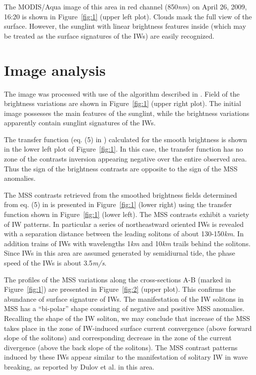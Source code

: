 \documentclass{report}
\begin{document}
The MODIS/Aqua image of this area in red channel (850\textit{nm}) on April 26, 2009, 16:20 is shown in Figure~\ref{fig:1} (upper left plot). Clouds mask the full view of the surface. However, the sunglint with linear brightness features inside (which may be treated as the surface signatures of the IWs) are easily recognized.


\section{Image analysis}

The image was processed with use of the algorithm described in \citep{Kudryavtsev2012a}. Field of the brightness variations  are shown in Figure~\ref{fig:1} (upper right plot). The initial image possesses the main features of the sunglint, while the brightness variations apparently contain sunglint signatures of the IWs.

The transfer function (eq. (5) in \citep{Kudryavtsev2012a}) calculated for the smooth brightness is shown in the lower left plot of Figure~\ref{fig:1}. In this case, the transfer function has no zone of the contrasts inversion appearing negative over the entire observed area. Thus the sign of the brightness contrasts are opposite to the sign of the MSS anomalies.

The MSS contrasts retrieved from the smoothed brightness fields determined from eq. (5) in \citep{Kudryavtsev2012a} is presented in Figure~\ref{fig:1} (lower right) using the transfer function shown in Figure~\ref{fig:1} (lower left). The MSS contrasts exhibit a variety of IW patterns. In particular a series of northeastward oriented IWs is revealed with a separation  distance between the leading solitons of about 130-150\textit{km}. In addition trains of IWs with wavelengths 1\textit{km} and 10\textit{km} trails behind the solitons. Since IWs in this area are assumed generated by semidiurnal tide, the phase speed of the IWs is about 3.5\textit{m/s}.   

The profiles of the MSS variations along the cross-sections A-B (marked in Figure~\ref{fig:1}) are presented in Figure~\ref{fig:2} (upper plot).  This confirms the abundance of surface signature of IWs. The manifestation of the IW solitons in MSS has a ``bi-polar'' shape consisting of negative and positive MSS anomalies. Recalling the shape of the IW soliton, we may conclude that increase of the MSS takes place in the zone of IW-induced surface current convergence (above forward slope of the solitons) and corresponding decrease in the zone of the current divergence (above the back slope of the solitons). The MSS contrast patterns induced by these IWs appear similar to the manifestation of solitary IW in wave breaking, as reported by Dulov et al. \cite{Dulov1986} in this area.
\end{document}
